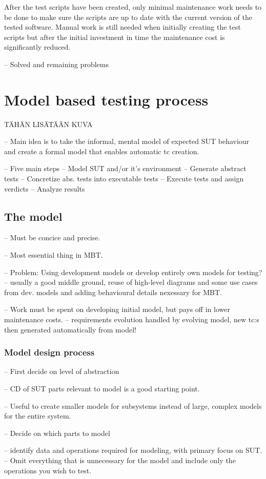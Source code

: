 After the test scripts have been created, only minimal maintenance work needs to be done to make sure the scripts are up to date with the current version of the tested software. Manual work is still needed when initially creating the test scripts but after the initial investment in time the maintenance cost is significantly reduced.


-- Solved and remaining problems

\section{Model based testing process}
TÄHÄN LISÄTÄÄN KUVA

-- Main idea is to take the informal, mental model of expected SUT behaviour and create a formal model that enables automatic tc creation. 

-- Five main steps
	-- Model SUT and/or it's environment
	-- Generate abstract tests
	-- Concretize abs. tests into executable tests
	-- Execute tests and assign verdicts
	-- Analyze results

\subsection{The model}
-- Must be concice and precise. 

-- Most essential thing in MBT.

-- Problem: Using development models or develop entirely own models for testing? 
	-- usually a good middle ground, reuse of high-level diagrams and some use cases from dev. models and adding behavioural details nexessary for MBT.

-- Work must be spent on developing initial model, but pays off in lower maintenance costs.
	-- requirements evolution handled by evolving model, new tc:s then generated automatically from model! 
	
\subsubsection{Model design process}
-- First decide on level of abstraction

-- CD of SUT parts relevant to model is a good starting point.

-- Useful to create smaller models for subsystems instead of large, complex models for the entire system. 

-- Decide on which parts to model

-- identify data and operations required for modeling, with primary focus on SUT.
	-- Omit everything that is unnecessary for the model and include only the operations you wish to test.
	
